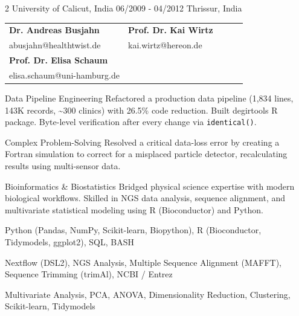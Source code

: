 \documentclass{thejus_cv}
\begin{document}
\begin{paracol}{2}
             {University of Calicut, India}
             {06/2009 - 04/2012}
             {Thrissur, India}
             {}


\begin{tabular}{@{}p{0.5\linewidth} p{0.5\linewidth}@{}}
\textbf{Dr. Andreas Busjahn} & \textbf{Prof. Dr. Kai Wirtz} \\
abusjahn@healthtwist.de & kai.wirtz@hereon.de \\[0.4cm]
\textbf{Prof. Dr. Elisa Schaum} & \\
elisa.schaum@uni-hamburg.de & \\
\end{tabular}
\vspace{0.4cm}

\switchcolumn



\cvstrength{\faStar}
           {Data Pipeline Engineering}
           {Refactored a production data pipeline (1,834 lines, 143K records, \textasciitilde300 clinics) with 26.5\% code reduction. Built degirtools R package. Byte-level verification after every change via \texttt{identical()}.}

\cvstrength{\faLightbulb}
           {Complex Problem-Solving}
           {Resolved a critical data-loss error by creating a Fortran simulation to correct for a misplaced particle detector, recalculating results using multi-sensor data.}

\cvstrength{\faAward}
           {Bioinformatics \& Biostatistics}
           {Bridged physical science expertise with modern biological workflows. Skilled in NGS data analysis, sequence alignment, and multivariate statistical modeling using R (Bioconductor) and Python.}


         {Python (Pandas, NumPy, Scikit-learn, Biopython), R (Bioconductor, Tidymodels, ggplot2), SQL, BASH}

         {Nextflow (DSL2), NGS Analysis, Multiple Sequence Alignment (MAFFT), Sequence Trimming (trimAl), NCBI / Entrez}

         {Multivariate Analysis, PCA, ANOVA, Dimensionality Reduction, Clustering, Scikit-learn, Tidymodels}


\end{paracol}
\end{document}
